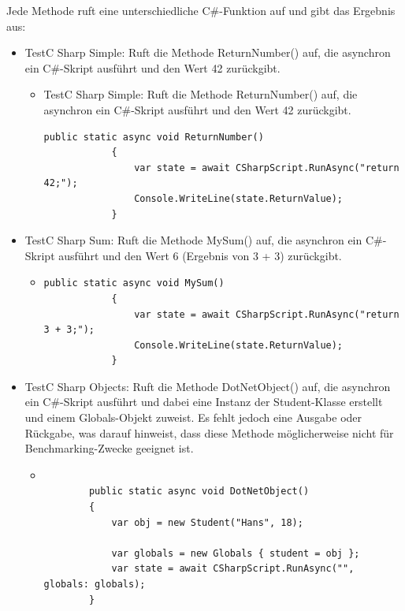 Jede Methode ruft eine unterschiedliche C\#-Funktion auf und gibt das Ergebnis aus:
\begin{itemize}
    \item TestC \textunderscore Sharp \textunderscore Simple: Ruft die Methode ReturnNumber() auf, die asynchron ein C\#-Skript ausführt und den Wert 42 zurückgibt.
    \begin{itemize}
        \item TestC \textunderscore Sharp \textunderscore Simple: Ruft die Methode ReturnNumber() auf, die asynchron ein C\#-Skript ausführt und den Wert 42 zurückgibt.
        \begin{lstlisting}[language={[Sharp]C}, caption=C\#Scripting ReturnNumber, label=lst:imp:cscnumber]
            public static async void ReturnNumber()
            {
                var state = await CSharpScript.RunAsync("return 42;");
                Console.WriteLine(state.ReturnValue);
            }
        \end{lstlisting}
    \end{itemize}
    \item TestC \textunderscore Sharp \textunderscore Sum: Ruft die Methode MySum() auf, die asynchron ein C\#-Skript ausführt und den Wert 6 (Ergebnis von 3 + 3) zurückgibt.

    \begin{itemize}
        \item 
        \begin{lstlisting}[language={[Sharp]C}, caption=C\#Scripting MySum, label=lst:imp:cscnumber]
            public static async void MySum()
            {
                var state = await CSharpScript.RunAsync("return 3 + 3;");
                Console.WriteLine(state.ReturnValue);
            }
        \end{lstlisting}
    \end{itemize}
    \item TestC \textunderscore Sharp \textunderscore Objects: Ruft die Methode DotNetObject() auf, die asynchron ein C\#-Skript ausführt und dabei eine Instanz der Student-Klasse erstellt und einem Globals-Objekt zuweist. Es fehlt jedoch eine Ausgabe oder Rückgabe, was darauf hinweist, dass diese Methode möglicherweise nicht für Benchmarking-Zwecke geeignet ist.
    \begin{itemize}
        \item 
        \begin{lstlisting}[language={[Sharp]C}, caption=C\#Scripting ReturnNumber, label=lst:imp:cscnumber]

        public static async void DotNetObject()
        {
            var obj = new Student("Hans", 18);

            var globals = new Globals { student = obj };
            var state = await CSharpScript.RunAsync("", globals: globals);
        }
        \end{lstlisting}
    \end{itemize}
\end{itemize}
 
